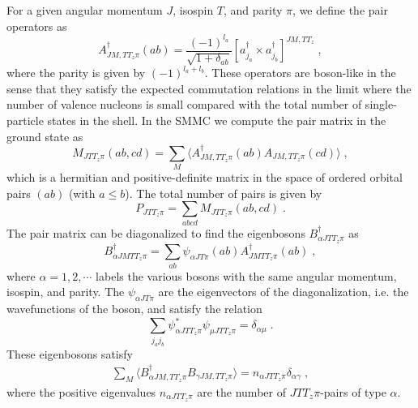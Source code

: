 \begin{multicols}{2}
For a given angular momentum $J$, isospin $T$, and
parity $\pi$, we define the pair operators as
\begin{equation}
A^\dagger_{JM,TT_z\pi} (a b) = \frac{(-1)^{l_a}}{\sqrt{1+\delta_{ab}}}
[ a_{j_a}^{\dagger}\times a_{j_b}^{\dagger} ]^{JM,TT_z}\;,
\end{equation}
where the parity is given by $(-1)^{l_a+l_b}$.
These operators are boson-like in the sense that
they satisfy the expected commutation relations in the limit
where the number of valence nucleons is small compared with  the total
number  of single-particle states in the shell.  In the SMMC we
compute the pair matrix  in the ground state as
\begin{equation}
M_{JTT_z\pi}(ab,cd) = \sum_M\langle A^{\dagger}_{JM,TT_z\pi}(a
b)A_{JM,TT_z\pi}(
c d)\rangle\;,
\end{equation}
which
is a hermitian and positive-definite matrix in the space of
ordered orbital pairs $(a b)$ (with $a\leq b$).
The total number of pairs is given by
\begin{equation}
P_{JTT_z\pi}=\sum_{abcd} M_{JTT_z\pi}(ab,cd)\;.
\end{equation}
The pair matrix can be diagonalized to find the eigenbosons
$B^{\dagger}_{\alpha JTT_z\pi}$ as
\begin{equation}
B^\dagger_{\alpha JMTT_z\pi}=\sum_{a b} \psi_{\alpha JT\pi}(a b)
A^{\dagger}_{JMTT_z\pi}(a b)\;,
\end{equation}
where $\alpha=1,2,\cdots$ labels the
various bosons with the same angular momentum, isospin, and parity. The
$\psi_{\alpha JT\pi}$ are the eigenvectors of the diagonalization, i.e.
the wavefunctions of the boson, and satisfy the
relation
\begin{equation}
\sum_{j_aj_b}
\psi^*_{\alpha JTT_z\pi}\psi_{\mu JTT_z\pi} =\delta_{\alpha\mu}\;.
\end{equation}
These eigenbosons satisfy
\begin{eqnarray}\label{9}
\sum_M \langle B_{\alpha JM,TT_z\pi}^\dagger  B_{\gamma JM,TT_z\pi}\rangle =
n_{\alpha JTT_z\pi} \delta_{\alpha \gamma}\;,
\end{eqnarray}
where the positive eigenvalues $n_{\alpha JTT_z\pi}$ are  the number of
$JTT_z\pi$-pairs of type $\alpha$.



\end{multicols}
